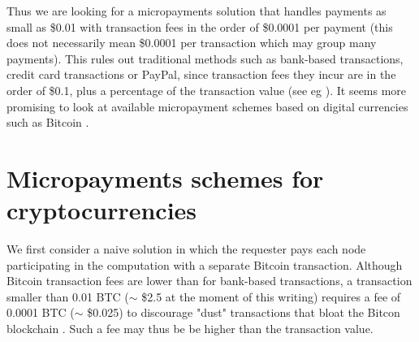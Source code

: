 \documentclass[a4paper]{article}
\begin{document}
    Thus we are looking for a micropayments solution that handles payments as small as \$0.01 with transaction fees
    in the order of \$0.0001 per payment (this does not necessarily mean \$0.0001 per transaction which may group many
    payments). This rules out traditional methods such as bank-based transactions, credit card transactions or PayPal,
    since transaction fees they incur are in the order of \$0.1, plus a percentage of the transaction value
    (see eg \cite{FRS}).
    It seems more promising to look at available micropayment schemes based on digital currencies such
    as Bitcoin \cite{BITCOIN}.

\section{Micropayments schemes for cryptocurrencies}

    We first consider a naive solution in which the requester pays each node participating in the computation
    with a separate Bitcoin transaction. Although Bitcoin transaction fees are lower than for bank-based transactions,
    a transaction smaller than 0.01 BTC ($\sim$ \$2.5 at the moment of this writing) requires a fee of
    0.0001 BTC ($\sim$ \$0.025) to discourage "dust" transactions that bloat the Bitcon blockchain \cite{BITFEE}.
    Such a fee may thus be be higher than the transaction value.
\end{document}
